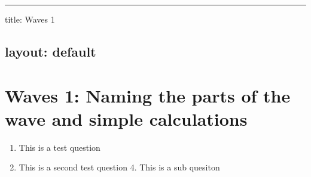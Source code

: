 \documentclass{article}
\begin{document}
 

\vspace{.5em} \hrule \vspace{.5em}
title: Waves 1

\hypertarget{layout_default}{}\subsection*{{layout: default}}\label{layout_default}

\hypertarget{waves_1_naming_the_parts_of_the_wave_and_simple_calculations}{}\section*{{Waves 1: Naming the parts of the wave and simple calculations}}\label{waves_1_naming_the_parts_of_the_wave_and_simple_calculations}

\begin{enumerate}%
\item This is a test question


\item This is a second test question 4. This is a sub quesiton



\end{enumerate}
\end{document}
